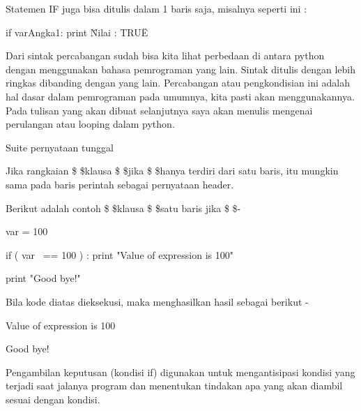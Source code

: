 \vspace{12pt}
\noindent 
Statemen IF juga bisa ditulis dalam 1 baris saja, misalnya seperti ini :  \par
\vspace{12pt}
\noindent 
if varAngka1: print \"Nilai : TRUE\" \par
\vspace{12pt}
\noindent 
Dari sintak percabangan sudah bisa kita lihat perbedaan di antara python dengan menggunakan bahasa pemrograman yang lain. Sintak ditulis dengan lebih ringkas dibanding dengan yang lain. Percabangan atau pengkondisian ini adalah hal dasar dalam pemrograman pada umumnya, kita pasti akan menggunakannya. Pada tulisan yang akan dibuat selanjutnya saya akan menulis mengenai perulangan atau looping dalam python. \par
\vspace{12pt}
\noindent 
Suite pernyataan tunggal \par
\vspace{12pt}
\noindent 
Jika rangkaian \$  \$klausa \$  \$jika \$  \$hanya terdiri dari satu baris, itu mungkin sama pada baris perintah sebagai pernyataan header. \par
\vspace{12pt}
\noindent 
Berikut adalah contoh \$  \$klausa \$  \$satu baris jika \$  \$- \par
\vspace{12pt}
\vspace{12pt}
\noindent 
var = 100 \par
\vspace{12pt}
\noindent 
if ( var~ == 100 ) : print "Value of expression is 100" \par
\vspace{12pt}
\noindent 
print "Good bye!" \par
\vspace{12pt}
\noindent 
Bila kode diatas dieksekusi, maka menghasilkan hasil sebagai berikut - \par
\vspace{12pt}
\noindent 
Value of expression is 100 \par
\vspace{12pt}
\noindent 
Good bye! \hspace*{1.31in}  \par
\noindent 
\vspace{12pt}
\noindent 
Pengambilan keputusan (kondisi if) digunakan untuk mengantisipasi kondisi yang terjadi saat jalanya program dan menentukan tindakan apa yang akan diambil sesuai dengan kondisi. \par
